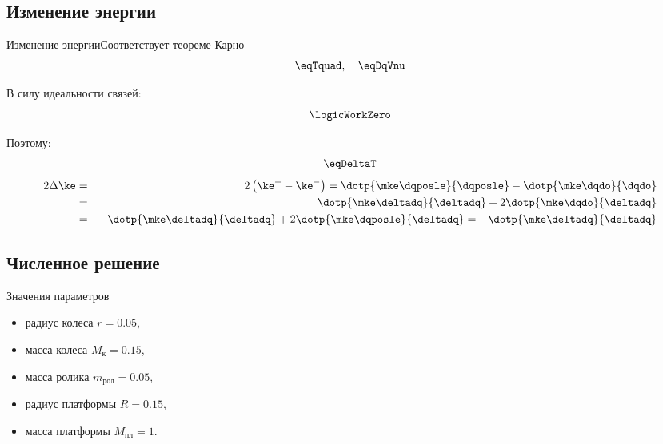 \subsection{Изменение энергии}

\begin{frame}{Изменение энергии}{Соответствует теореме Карно}
    $$ \eqTquad, \quad \eqDqVnu $$

    В силу идеальности связей:
    $$ \logicWorkZero $$
    
    Поэтому:
        $$ \eqDeltaT $$
    \begin{eqnarray*}
        2\Delta\ke & = & 2\left(\ke^+ - \ke^-\right) = \dotp{\mke\dqposle}{\dqposle} - \dotp{\mke\dqdo}{\dqdo} \\
        & = & \dotp{\mke\deltadq}{\deltadq} + 2\dotp{\mke\dqdo}{\deltadq} \\
        & = & -\dotp{\mke\deltadq}{\deltadq} + 2\dotp{\mke\dqposle}{\deltadq} = -\dotp{\mke\deltadq}{\deltadq}
    \end{eqnarray*}
\end{frame}

\subsection{Численное решение}

\begin{frame}{Значения параметров}
    \begin{itemize}
        \item радиус колеса $r = 0.05$,
        \item масса колеса $ M_{\text{к}} = 0.15$, 
        \item масса ролика $m_{\text{рол}} = 0.05$, 
        \item радиус платформы $R = 0.15$, 
        \item масса платформы $M_{\text{пл}} = 1$.
    \end{itemize}
\end{frame}

